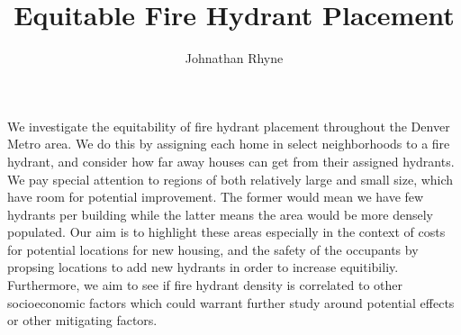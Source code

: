 \documentclass{article}
\title{Equitable Fire Hydrant Placement}
\author{Johnathan Rhyne}
\begin{document}
    \maketitle
    \paragraph{} We investigate the equitability of fire hydrant placement throughout the Denver Metro area. 
    We do this by assigning each home in select neighborhoods to a fire hydrant, and consider how far away
    houses can get from their assigned hydrants. We pay special attention to regions of both relatively large
    and small size, which have room for potential improvement. The former would mean we have few hydrants per building 
    while the latter means the area would be more densely populated.
    Our aim is to highlight these areas especially in the context of costs for potential locations for new housing,
    and the safety of the occupants by propsing locations to add new hydrants in order to increase equitibiliy.
    Furthermore, we
    aim to see if fire hydrant density is correlated to other socioeconomic factors which could warrant further 
    study around potential effects or other mitigating factors.
\end{document}
